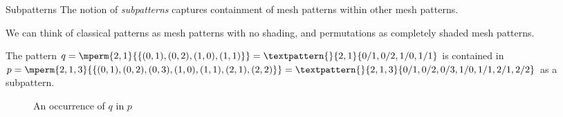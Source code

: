 %

\begin{frame}{Subpatterns}
  The notion of \emph{subpatterns} captures containment of mesh patterns within
  other mesh patterns.

  We can think of classical patterns as mesh patterns with no shading, and
  permutations as completely shaded mesh patterns.
  \begin{example}
      The pattern \(q=\mperm{2,1}{\{(0,1),(0,2),(1,0),(1,1)\}}=
      \textpattern{}{ 2, 1 }{ 0/1, 0/2, 1/0, 1/1}\) is contained in
      \(p=\mperm{2,1,3}{\{(0,1),(0,2),(0,3),(1,0),(1,1),(2,1),(2,2)\}}=
      \textpattern{}{ 2, 1, 3 }{ 0/1, 0/2,0/3, 1/0, 1/1, 2/1, 2/2 }\) as a
      subpattern.
      \begin{figure}[htb]
        \centering
      \caption{ An occurrence of \(q\) in \(p\) }
      \end{figure}
  \end{example}
\end{frame}
